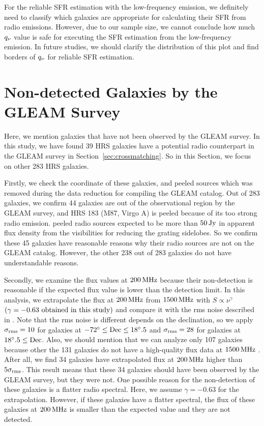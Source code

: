 For the reliable SFR estimation with the low-frequency emission, we definitely need to classify which galaxies are appropriate for calculating their SFR from radio emissions.
However, due to our sample size, we cannot conclude how much $q_{\nu}$ value is safe for executing the SFR estimation from the low-frequency emission.
In future studies, we should clarify the distribution of this plot and find borders of $q_{\nu}$ for reliable SFR estimation.


\section{Non-detected Galaxies by the GLEAM Survey}\label{sec:nondetectedgalaxiesbythegleamsurvey}

Here, we mention galaxies that have not been observed by the GLEAM survey.
In this study, we have found 39 HRS galaxies have a potential radio counterpart in the GLEAM survey in Section~\ref{sec:crossmatching}.
So in this Section, we focus on other 283 HRS galaxies.

Firstly, we check the coordinate of these galaxies, and peeled sources which was removed during the data reduction for compiling the GLEAM catalog.
Out of 283 galaxies, we confirm 44 galaxies are out of the observational region by the GLEAM survey, and HRS 183 (M87, Virgo A) is peeled because of its too strong radio emission.
\citet{Hurley-Walker2017a} peeled radio sources expected to be more than $50\,\mathrm{Jy}$ in apparent flux density from the visibilities for reducing the grating sidelobes.
So we confirm these 45 galaxies have reasonable reasons why their radio sources are not on the GLEAM catalog.
However, the other 238 out of 283 galaxies do not have understandable reasons.

Secondly, we examine the flux values at $200\,\mathrm{MHz}$ because their non-detection is reasonable if the expected flux value is lower than the detection limit.
In this analysis, we extrapolate the flux at $200\,\mathrm{MHz}$ from $1500\,\mathrm{MHz}$ \citep{Boselli2015} with $S \propto \nu^{\gamma}$ $\left(\gamma = -0.63\ \text{obtained in this study}\right)$ and compare it with the rms noise described in \citet{Hurley-Walker2017a}.
Note that the rms noise is different depends on the declination, so we apply $\sigma_{\mathrm{rms}} = 10$ for galaxies at $-72^{\circ} \leq \mathrm{Dec} \leq 18^{\circ}.5$ and $\sigma_{\mathrm{rms}} = 28$ for galaxies at $18^{\circ}.5 \leq \mathrm{Dec}$.
Also, we should mention that we can analyze only 107 galaxies because other the 131 galaxies do not have a high-quality flux data at $1500\,\mathrm{MHz}$ \citep{Boselli2015}.
After all, we find 34 galaxies have extrapolated flux at $200\,\mathrm{MHz}$ higher than $5\sigma_{\mathrm{rms}}$.
This result means that these 34 galaxies should have been observed by the GLEAM survey, but they were not.
One possible reason for the non-detection of these galaxies is a flatter radio spectral.
Here, we assume $\gamma = -0.63$ for the extrapolation.
However, if these galaxies have a flatter spectral, the flux of these galaxies at $200\,\mathrm{MHz}$ is smaller than the expected value and they are not detected.

